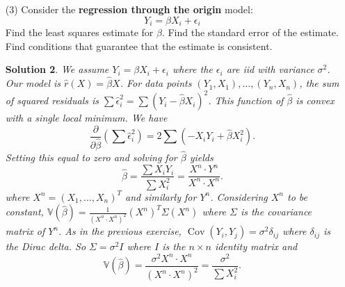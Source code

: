 \documentclass[10pt]{article}
\newtheorem*{sol}{Solution}
\newcommand{\V}{\mathbb{V}}
\newcommand{\Cov}{\operatorname{Cov}}
\begin{document}
\begin{enumerate}
\begin{sol}
From $\hat \beta_0 = \overline{Y_n} - \hat \beta_1 \overline{X_n}$, we see
\[
\Cov(\hat \beta_0, \hat \beta_1) = \Cov(\overline{Y_n},\hat \beta_1) -
\overline{X_n} \Cov(\hat \beta_1, \hat \beta_1).
\]
By our previous calculations,
\[
\Cov(\overline{Y_n},\hat\beta_1) = \frac{1}{n s_X^2} \sum (X_i-\overline{X_n})
\Cov(\overline{Y_n}, Y_i-\overline{Y_n}) = \frac{1}{n s_X^2}
\sum (X_i - \overline{X_n})\left(\frac{\sigma^2}{n} - \frac{\sigma^2}{n}\right)
= 0
\]
and this leaves $\Cov(\hat \beta_0, \hat \beta_1) = -\overline{X_n} \V(\hat \beta_1)$,
as claimed.

Finally,
\[
\V(\hat \beta_0) = \V(\overline{Y_n}) -
2 \overline{X_n} \Cov(\overline{Y_n}, \hat \beta_1) + \overline{X_n}^2\V(\hat \beta_1)
= \frac{\sigma^2}{n} + \frac{\sigma^2 \overline{X_n}^2}{ns_X^2} =
\frac{\sigma^2(s_X^2 + \overline{X_n}^2)}{ns_X^2}
\]
and we calculate that $s_X^2+\overline{X_n}^2=\frac{1}{n}\sum X_i^2$.
This gives the $(1,1)$ entry of the covariance matrix.
\end{sol}

\item[(3)] Consider the \textbf{regression through the origin} model:
\[
Y_i = \beta X_i + \epsilon_i
\]
Find the least squares estimate for $\beta$. Find the standard error of the
estimate. Find conditions that guarantee that the estimate is consistent.

\begin{sol}
We assume $Y_i = \beta X_i + \epsilon_i$ where the $\epsilon_i$ are iid with
variance $\sigma^2$.
Our model is $\hat r(X)=\hat \beta X$. For data points $(Y_1,X_1), \ldots, (Y_n,X_n)$,
the sum of squared residuals is
$\sum \hat \epsilon_i^2 = \sum (Y_i - \hat \beta X_i)^2$. This function of $\hat \beta$
is convex with a single local minimum. We have
\[
\frac{\partial}{\partial \hat\beta} \left(\sum \hat \epsilon_i^2\right) =
2 \sum \left(-X_iY_i + \hat \beta X_i^2\right).
\]
Setting this equal to zero and solving for $\hat\beta$ yields
\[
\hat\beta = \frac{\sum X_iY_i}{\sum X_i^2} = \frac{X^n \cdot Y^n}
{X^n \cdot X^n}.
\]
where $X^n = (X_1,\ldots,X_n)^T$ and similarly for $Y^n$. Considering
$X^n$ to be constant, $\V(\hat \beta) =
\frac{1}{(X^n \cdot X^n)^2} (X^n)^T \Sigma (X^n)$ where $\Sigma$ is the covariance
matrix of $Y^n$. As in the previous exercise, $\Cov(Y_i,Y_j)=\sigma^2 \delta_{ij}$
where $\delta_{ij}$ is the Dirac delta. So $\Sigma=\sigma^2 I$ where $I$ is the
$n\times n$ identity matrix and
\[
\V(\hat\beta) = \frac{\sigma^2 X^n \cdot X^n}{(X^n \cdot X^n)^2}
= \frac{\sigma^2}{\sum X_i^2}.
\]


\end{sol}
\end{enumerate}
\end{document}
